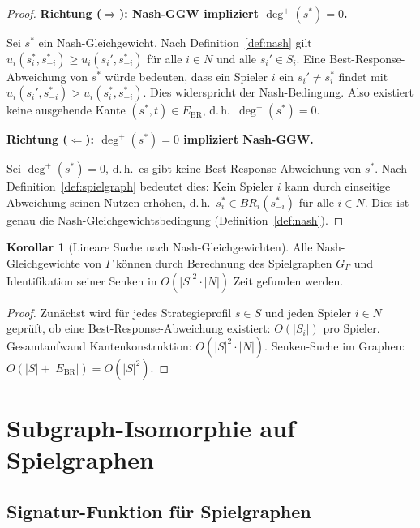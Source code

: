 ﻿\documentclass[a4paper,12pt]{article}
\theoremstyle{definition}
\newtheorem{korollar}{Korollar}
\begin{document}
\begin{proof}
\textbf{Richtung ($\Rightarrow$): Nash-GGW impliziert $\deg^+(s^*) = 0$.}

Sei $s^*$ ein Nash-Gleichgewicht. Nach Definition~\ref{def:nash} gilt
$u_i(s_i^*, s_{-i}^*) \geq u_i(s_i', s_{-i}^*)$ f\"ur alle $i \in N$
und alle $s_i' \in S_i$.
Eine Best-Response-Abweichung von $s^*$ w\"urde bedeuten, dass ein Spieler $i$
ein $s_i' \neq s_i^*$ findet mit $u_i(s_i', s_{-i}^*) > u_i(s_i^*, s_{-i}^*)$.
Dies widerspricht der Nash-Bedingung.
Also existiert keine ausgehende Kante $(s^*, t) \in E_{\mathrm{BR}}$,
d.\,h.\ $\deg^+(s^*) = 0$.

\textbf{Richtung ($\Leftarrow$): $\deg^+(s^*) = 0$ impliziert Nash-GGW.}

Sei $\deg^+(s^*) = 0$, d.\,h.\ es gibt keine Best-Response-Abweichung von $s^*$.
Nach Definition~\ref{def:spielgraph} bedeutet dies: Kein Spieler $i$ kann durch
einseitige Abweichung seinen Nutzen erh\"ohen, d.\,h.\
$s_i^* \in BR_i(s_{-i}^*)$ f\"ur alle $i \in N$.
Dies ist genau die Nash-Gleichgewichtsbedingung (Definition~\ref{def:nash}).
\end{proof}

\begin{korollar}[Lineare Suche nach Nash-Gleichgewichten]
\label{kor:linsuche}
Alle Nash-Gleichgewichte von $\Gamma$ k\"onnen durch Berechnung des
Spielgraphen $G_\Gamma$ und Identifikation seiner Senken in
$O(|S|^2 \cdot |N|)$ Zeit gefunden werden.
\end{korollar}

\begin{proof}
Zun\"achst wird f\"ur jedes Strategieprofil $s \in S$ und jeden Spieler $i \in N$
gepr\"uft, ob eine Best-Response-Abweichung existiert: $O(|S_i|)$ pro Spieler.
Gesamtaufwand Kantenkonstruktion: $O(|S|^2 \cdot |N|)$.
Senken-Suche im Graphen: $O(|S| + |E_{\mathrm{BR}}|) = O(|S|^2)$.
\end{proof}

\section{Subgraph-Isomorphie auf Spielgraphen}

\subsection{Signatur-Funktion f\"ur Spielgraphen}
\end{document}
